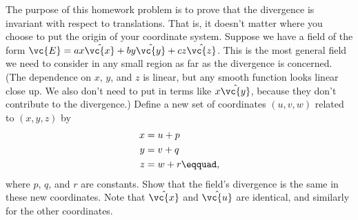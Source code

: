         The purpose of this homework problem is to prove that the
        divergence is invariant with respect to translations. That is, it
        doesn't matter where you choose to put the origin of your
        coordinate system. Suppose we have a field of the form
        $\vc{E}=ax\hat{\vc{x}}+by\hat{\vc{y}}+cz\hat{\vc{z}}$.
        This is the most general field we need to consider in
        any small region as far as the divergence is concerned. (The dependence
        on $x$, $y$, and $z$ is linear, but any smooth function looks
        linear close up. We also don't need to put in terms like
        $x\hat{\vc{y}}$, because they don't contribute to the divergence.)
        Define a new set of coordinates $(u,v,w)$ related to $(x,y,z)$  by
        \begin{align*}
                        x  &=  u + p  \\
                        y  &=  v + q     \\
                        z  &=  w + r\eqquad,  
        \end{align*}
        where $p$, $q$, and $r$ are constants. Show that the field's
        divergence is the same in these new coordinates. Note that $\hat{\vc{x}}$
        and $\hat{\vc{u}}$ are identical, and similarly for the other coordinates.
